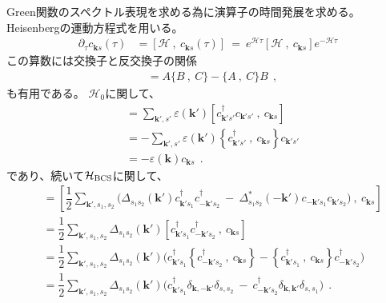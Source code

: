 \documentclass[a4j]{jsarticle}
\begin{document}
Green関数のスペクトル表現を求める為に演算子の時間発展を求める。
Heisenbergの運動方程式を用いる。
\begin{align}
	\partial_{\tau} c_{\bm{k}s} (\tau)
	 & =
	\left[ \mathcal{H} \ , \ c_{\bm{k}s}(\tau) \right]
	\ = \
	e^{\mathcal{H} \tau} \left[ \mathcal{H} \ , \ c_{\bm{k}s} \right] e^{- \mathcal{H} \tau}
\end{align}
この算数には交換子と反交換子の関係
\begin{align}
	[AB \ , \ C]
	 & =
	A \{ B \ , \ C \} - \{ A \ , \ C \} B
	\ \ ,
\end{align}
も有用である。
$\mathcal{H}_{0}$に関して、
\begin{align}
	[ \mathcal{H}_{0} \ , \ c_{\bm{k}s} ]
	 & =
	\sum_{\bm{k}',s'}
	\varepsilon(\bm{k}')
	\left[
		c_{\bm{k}' s'}^{\dagger}
		c_{\bm{k}' s'}
		\ , \
		c_{\bm{k}s}
		\right]
	\nonumber \\[2mm] &=
	-
	\sum_{\bm{k}',s'}
	\varepsilon(\bm{k}')
	\left\{
	c_{\bm{k}' s'}^{\dagger}
	\ , \
	c_{\bm{k}s}
	\right\}
	c_{\bm{k}' s'}
	\nonumber \\[2mm] &=
	-
	\varepsilon( \bm{k} )
	c_{\bm{k} s}
	\ \ .
\end{align}
であり、続いて$\mathcal{H}_{\rm BCS}$に関して、
\begin{align}
	[ \mathcal{H}_{\rm BCS} \ , \ c_{\bm{k}s} ]
	 & =
	\left[
		\dfrac{1}{2}
		\sum_{\bm{k}',s_{1},s_{2}}
		\Big(
		\Delta_{ s_{1} s_{2} }( \bm{k}' )
		c_{\bm{k}' s_{1}}^{\dagger}
		c_{-\bm{k}' s_{2}}^{\dagger}
		\ - \
		\Delta_{ s_{1} s_{2} }^{*}( - \bm{k}' )
		c_{-\bm{k}' s_{1}}
		c_{\bm{k}' s_{2}}
		\Big)
		\ , \
		c_{\bm{k}s}
		\right]
	\nonumber \\[2mm] &=
	\dfrac{1}{2}
	\sum_{\bm{k}',s_{1},s_{2}}
	\Delta_{ s_{1} s_{2} }( \bm{k}' )
	\left[
		c_{\bm{k}' s_{1}}^{\dagger}
		c_{-\bm{k}' s_{2}}^{\dagger}
		\ , \
		c_{\bm{k}s}
		\right]
	\nonumber \\[2mm] &=
	\dfrac{1}{2}
	\sum_{\bm{k}',s_{1},s_{2}}
	\Delta_{ s_{1} s_{2} }( \bm{k}' )
	\Big(
	c_{\bm{k}' s_{1}}^{\dagger}
	\left\{
	c_{-\bm{k}' s_{2}}^{\dagger}
	\ , \
	c_{\bm{k}s}
	\right\}
	-
	\left\{
	c_{\bm{k}' s_{1}}^{\dagger}
	\ , \
	c_{\bm{k}s}
	\right\}
	c_{-\bm{k}' s_{2}}^{\dagger}
	\Big)
	\nonumber \\[2mm] &=
	\dfrac{1}{2}
	\sum_{\bm{k}',s_{1},s_{2}}
	\Delta_{ s_{1} s_{2} }( \bm{k}' )
	\Big(
	c_{\bm{k}' s_{1}}^{\dagger}
	\delta_{\bm{k},-\bm{k}'}
	\delta_{s,s_{2}}
	\ - \
	c_{-\bm{k}' s_{2}}^{\dagger}
	\delta_{\bm{k},\bm{k}'}
	\delta_{s,s_{1}}
	\Big)
	\ \ .
\end{align}
\end{document}
